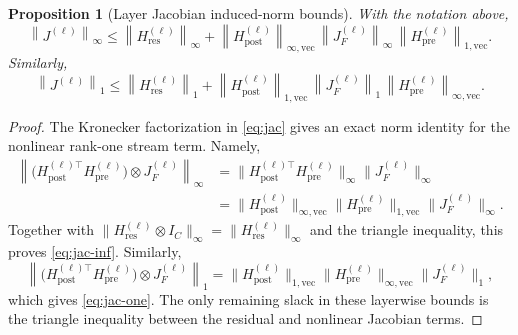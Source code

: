 \documentclass[10pt]{article}
\numberwithin{equation}{section}
\theoremstyle{plain}
\newtheorem{proposition}[theorem]{Proposition}
\theoremstyle{definition}
\theoremstyle{remark}
\newcommand{\norm}[1]{\left\lVert #1 \right\rVert}
\newcommand{\Hres}{H_{\mathrm{res}}}
\newcommand{\Hpre}{H_{\mathrm{pre}}}
\newcommand{\Hpost}{H_{\mathrm{post}}}
\begin{document}
\begin{proposition}[Layer Jacobian induced-norm bounds]\label{prop:full-jac}
With the notation above,
\begin{equation}\label{eq:jac-inf}
\norm{J^{(\ell)}}_{\infty}
\le
\norm{\Hres^{(\ell)}}_{\infty}
+
\norm{\Hpost^{(\ell)}}_{\infty,\mathrm{vec}}\,
\norm{J_F^{(\ell)}}_{\infty}\,
\norm{\Hpre^{(\ell)}}_{1,\mathrm{vec}}.
\end{equation}
Similarly,
\begin{equation}\label{eq:jac-one}
\norm{J^{(\ell)}}_{1}
\le
\norm{\Hres^{(\ell)}}_{1}
+
\norm{\Hpost^{(\ell)}}_{1,\mathrm{vec}}\,
\norm{J_F^{(\ell)}}_{1}\,
\norm{\Hpre^{(\ell)}}_{\infty,\mathrm{vec}}.
\end{equation}
\end{proposition}

\begin{proof}
The Kronecker factorization in \eqref{eq:jac} gives an exact norm identity for
the nonlinear rank-one stream term. Namely,
\[
\begin{aligned}
\left\|
\big(\Hpost^{(\ell)\top}\Hpre^{(\ell)}\big)\otimes J_F^{(\ell)}
\right\|_\infty
&=
\|\Hpost^{(\ell)\top}\Hpre^{(\ell)}\|_\infty
\|J_F^{(\ell)}\|_\infty\\
&=
\|\Hpost^{(\ell)}\|_{\infty,\mathrm{vec}}
\|\Hpre^{(\ell)}\|_{1,\mathrm{vec}}
\|J_F^{(\ell)}\|_\infty.
\end{aligned}
\]
Together with $\|\Hres^{(\ell)}\otimes I_C\|_\infty=\|\Hres^{(\ell)}\|_\infty$
and the triangle inequality, this proves \eqref{eq:jac-inf}. Similarly,
\[
\left\|
\big(\Hpost^{(\ell)\top}\Hpre^{(\ell)}\big)\otimes J_F^{(\ell)}
\right\|_1
=
\|\Hpost^{(\ell)}\|_{1,\mathrm{vec}}
\|\Hpre^{(\ell)}\|_{\infty,\mathrm{vec}}
\|J_F^{(\ell)}\|_1,
\]
which gives \eqref{eq:jac-one}. The only remaining slack in these layerwise
bounds is the triangle inequality between the residual and nonlinear Jacobian
terms.
\end{proof}
\end{document}
